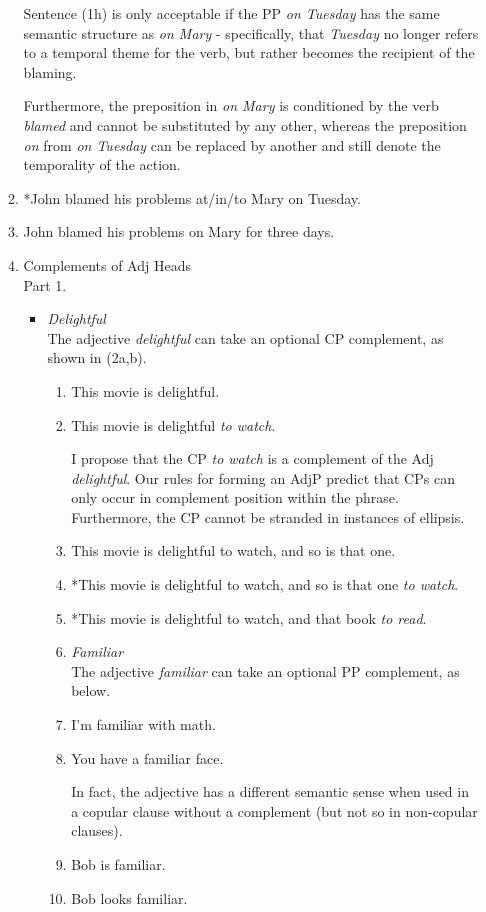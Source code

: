\documentclass[12pt]{article}
\begin{document}
\begin{enumerate}
\begin{enumerate}
Sentence (1h) is only acceptable if the PP \emph{on Tuesday} has the same semantic structure as \emph{on Mary} - specifically, that \emph{Tuesday} no longer refers to a temporal theme for the verb, but rather becomes the recipient of the blaming.

Furthermore, the preposition in \emph{on Mary} is conditioned by the verb \emph{blamed} and cannot be substituted by any other, whereas the preposition \emph{on} from \emph{on Tuesday} can be replaced by another and still denote the temporality of the action.
\item *John blamed his problems at/in/to Mary on Tuesday.
\item John blamed his problems on Mary for three days.

\item Complements of Adj Heads\\
Part 1.
\begin{itemize}[leftmargin=*]
\item[] \emph{Delightful}\\
The adjective \emph{delightful} can take an optional CP complement, as shown in (2a,b).
\begin{enumerate}
\item This movie is delightful.
\item This movie is delightful \emph{to watch}.

I propose that the CP \emph{to watch} is a complement of the Adj \emph{delightful}. Our rules for forming an AdjP predict that CPs can only occur in complement position within the phrase. Furthermore, the CP cannot be stranded in instances of ellipsis.
\item This movie is delightful to watch, and so is that one.
\item *This movie is delightful to watch, and so is that one \emph{to watch}.
\item *This movie is delightful to watch, and that book \emph{to read}.

\item[] \emph{Familiar}\\
The adjective \emph{familiar} can take an optional PP complement, as below.
\item I'm familiar with math.
\item You have a familiar face.

In fact, the adjective has a different semantic sense when used in a copular clause without a complement (but not so in non-copular clauses).
\item Bob is familiar.
\item Bob looks familiar.


\end{enumerate}
\end{itemize}
\end{enumerate}
\end{enumerate}
\end{document}
